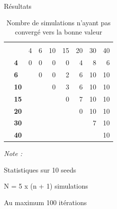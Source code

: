 \documentclass[10pt,xcolor=table,color={dvipsnames,usenames},ignorenonframetext,usepdftitle=false,french]{beamer}
\begin{document}
\begin{frame}{Résultats}
\protect\hypertarget{ruxe9sultats-10}{}

\begin{table}

\caption{\label{tab:tabq3nbnonconv}Nombre de simulations n'ayant pas convergé vers la bonne valeur}
\centering
\begin{threeparttable}
\begin{tabular}[t]{>{\bfseries}l|>{\bfseries}l|r|r|r|r|r|r|r}
\hline
\multicolumn{2}{c|}{ } & \multicolumn{7}{c}{m} \\
\cline{3-9}
  &    & 4 & 6 & 10 & 15 & 20 & 30 & 40\\
\hline
 & 4 & 0 & 0 & 0 & 0 & 4 & 8 & 6\\
\cline{2-9}
 & 6 &  & 0 & 0 & 2 & 6 & 10 & 10\\
\cline{2-9}
 & 10 &  &  & 0 & 3 & 6 & 10 & 10\\
\cline{2-9}
 & 15 &  &  &  & 0 & 7 & 10 & 10\\
\cline{2-9}
 & 20 &  &  &  &  & 0 & 10 & 10\\
\cline{2-9}
 & 30 &  &  &  &  &  & 7 & 10\\
\cline{2-9}
\multirow{-7}{*}{\raggedright\arraybackslash n} & 40 &  &  &  &  &  &  & 10\\
\hline
\end{tabular}
\begin{tablenotes}
\item \textit{Note : } 
\item Statistiques sur 10 seeds
\item N = 5 x (n + 1) simulations
\item Au maximum 100 itérations
\end{tablenotes}
\end{threeparttable}
\end{table}

\end{frame}
\end{document}
